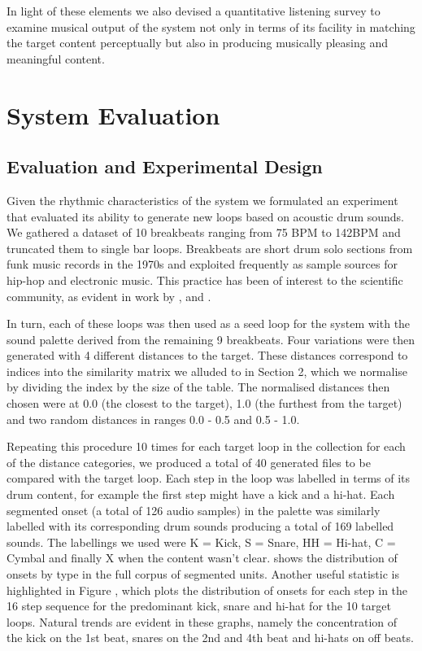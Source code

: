 In light of these elements we also devised a quantitative listening survey to examine musical output of the system not only in terms of its facility in matching the target content perceptually but also in producing musically pleasing and meaningful content.

\section{System Evaluation}

\subsection{Evaluation and Experimental Design}

Given the rhythmic characteristics of the system we formulated an experiment that evaluated its ability to generate new loops based on acoustic drum sounds. We gathered a dataset of 10 breakbeats ranging from 75 BPM to 142BPM and truncated them to single bar loops. Breakbeats are short drum solo sections from funk music records in the 1970s and exploited frequently as sample sources for hip-hop and electronic music. This practice has been of interest to the scientific community, as evident in work by \cite{Ravelli2007}, \cite{Hockman2015} and \cite{Collins2006}.

In turn, each of these loops was then used as a seed loop for the system with the sound palette derived from the remaining 9 breakbeats. Four variations were then generated with 4 different distances to the target.  These distances correspond to indices into the similarity matrix we alluded to in Section 2, which we normalise by dividing the index by the size of the table. The normalised distances then chosen were at 0.0 (the closest to the target), 1.0 (the furthest from the target) and two random distances in ranges 0.0 - 0.5 and 0.5 - 1.0.

Repeating this procedure 10 times for each target loop in the collection for each of the distance categories, we produced a total of 40 generated files to be compared with the target loop. Each step in the loop was labelled in terms of its drum content, for example the first step might have a kick and a hi-hat. Each segmented onset (a total of 126 audio samples)  in the palette was similarly labelled with its corresponding drum sounds producing a total of 169 labelled sounds. The labellings we used were K = Kick, S = Snare, HH = Hi-hat, C = Cymbal and finally X when the content wasn’t clear.  shows the distribution of onsets by type in the full corpus of segmented units. Another useful statistic is highlighted in Figure , which plots the distribution of onsets for each step in the 16 step sequence for the predominant kick, snare and hi-hat for the 10 target loops. Natural trends are evident in these graphs, namely the concentration of the kick on the 1st beat, snares on the 2nd and 4th beat and hi-hats on off beats.

